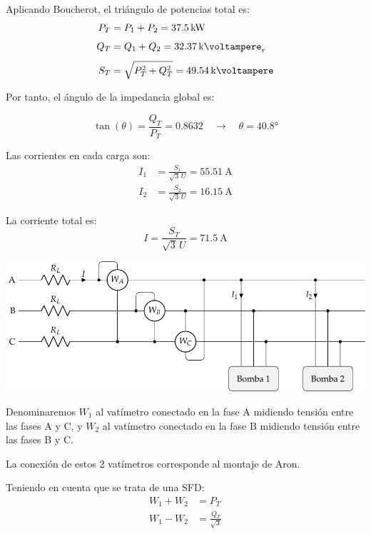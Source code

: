\vspace{5mm}
 Aplicando Boucherot, el triángulo de potencias total es:
 \begin{align*}
   P_T &= P_1 + P_2 = \SI{37.5}{\kilo\watt}\\[4pt]
   Q_T &= Q_1 + Q_2 = \SI{32.37}{\kilo\voltampere}_r\\[4pt]
   S_T &= \sqrt{P_T^2 + Q_T^2} = \SI{49.54}{\kilo\voltampere}
 \end{align*}

\vspace{2mm}
 Por tanto, el ángulo de la impedancia global es:

\[
  \tan(\theta) = \frac{Q_T}{P_T} = 0.8632 \quad \rightarrow \quad \theta =
  \ang{40.8}
\]

\vspace{2mm}
Las corrientes en cada carga son:
\begin{align*}
  I_1 &= \frac{S_1}{\sqrt{3} \,U} = \SI{55.51}{\ampere}\\
  I_2 &= \frac{S_2}{\sqrt{3} \,U} = \SI{16.15}{\ampere}
\end{align*}

La corriente total es:
\[
  I = \frac{S_T}{{\sqrt{3} \,U}} = \SI{71.5}{\ampere}
\]

\begin{center}
    \includegraphics[width=.9\textwidth]{figuras/BT3_ej5_bombas_vatimetros.pdf}
\end{center}

\vspace{2mm}
Denominaremos $W_1$ al vatímetro conectado en la fase A midiendo
tensión entre las fases A y C, y $W_2$ al vatímetro conectado en
la fase B midiendo tensión entre las fases B y C. 

\vspace{3mm}
La conexión de estos 2 vatímetros corresponde al montaje de Aron.

\vspace{4mm}
Teniendo en cuenta que se trata de una SFD: 
\begin{align*}
  W_1 + W_2 &= P_T\\[3pt]
  W_1 - W_2 &= \frac{Q_T}{\sqrt{3}}
\end{align*}

